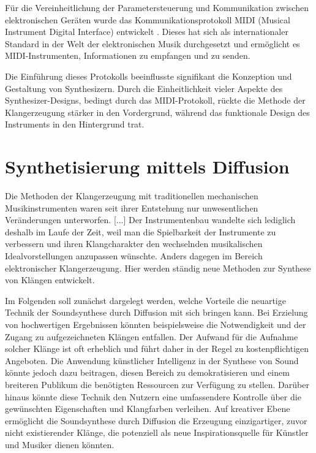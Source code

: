 \documentclass[
  a4paper,  %
  twoside,  %
  bibliography=totoc,
  headsepline,
  cleardoublepage=empty,
  parskip=half,
  draft=false
]{scrbook}
\begin{document}
Für die Vereinheitlichung der Parametersteuerung und Kommunikation zwischen elektronischen Geräten wurde das Kommunikationsprotokoll MIDI (Musical Instrument Digital Interface)\cite{midi_association_midi_nodate} entwickelt . Dieses hat sich als internationaler Standard in der Welt der elektronischen Musik durchgesetzt und ermöglicht es MIDI-Instrumenten, Informationen zu empfangen und zu senden. \cite{ruschkowski_elektronische_2019}

Die Einführung dieses Protokolls beeinflusste signifikant die Konzeption und Gestaltung von Synthesizern. Durch die Einheitlichkeit vieler Aspekte des Synthesizer-Designs, bedingt durch das MIDI-Protokoll, rückte die Methode der Klangerzeugung stärker in den Vordergrund, während das funktionale Design des Instruments in den Hintergrund trat. \cite{russ_sound_2009}

\section{Synthetisierung mittels Diffusion}

\glqq Die Methoden der Klangerzeugung mit traditionellen mechanischen Musikinstrumenten waren seit ihrer Entstehung nur unwesentlichen Veränderungen unterworfen. [...] Der Instrumentenbau wandelte sich lediglich deshalb im Laufe der Zeit, weil man die Spielbarkeit der Instrumente zu verbessern und ihren Klangcharakter den wechselnden musikalischen Idealvorstellungen anzupassen wünschte. Anders dagegen im Bereich elektronischer Klangerzeugung. Hier werden ständig neue Methoden zur Synthese von Klängen entwickelt.\grqq \, \cite{ruschkowski_elektronische_2019}

Im Folgenden soll zunächst dargelegt werden, welche Vorteile die neuartige Technik der Soundsynthese durch Diffusion mit sich bringen kann. Bei Erzielung von hochwertigen Ergebnissen könnten beispielsweise die Notwendigkeit und der Zugang zu aufgezeichneten Klängen entfallen. Der Aufwand für die Aufnahme solcher Klänge ist oft erheblich und führt daher in der Regel zu kostenpflichtigen Angeboten. Die Anwendung künstlicher Intelligenz in der Synthese von Sound könnte jedoch dazu beitragen, diesen Bereich zu demokratisieren und einem breiteren Publikum die benötigten Ressourcen zur Verfügung zu stellen. Darüber hinaus könnte diese Technik den Nutzern eine umfassendere Kontrolle über die gewünschten Eigenschaften und Klangfarben verleihen. Auf kreativer Ebene ermöglicht die Soundsynthese durch Diffusion die Erzeugung einzigartiger, zuvor nicht existierender Klänge, die potenziell als neue Inspirationsquelle für Künstler und Musiker dienen könnten. \cite{haohe_liu_audioldm_2023}
\end{document}
